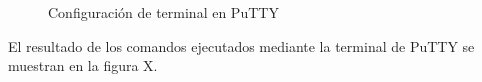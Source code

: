 	\begin{figure}[htbp!]
		\centering
		\caption{Configuración de terminal en PuTTY}
		\label{fig:ConfiguracionPutty}
	\end{figure}
 
El resultado de los comandos ejecutados mediante la terminal de PuTTY se muestran en la figura X.